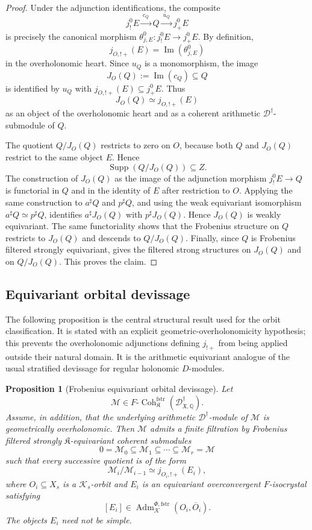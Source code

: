 \documentclass[11pt]{amsart}
\theoremstyle{plain}
\newtheorem{proposition}{Proposition}[section]
\theoremstyle{definition}
\theoremstyle{remark}
\newcommand{\Coh}{\operatorname{Coh}}
\newcommand{\Supp}{\operatorname{Supp}}
\newcommand{\fstr}{\mathrm{fstr}}
\newcommand{\Adm}{\operatorname{Adm}}
\begin{document}
\begin{proof}
Under the adjunction identifications, the composite
\[
  j^0_!E\xrightarrow{\ c_Q\ } Q
  \xrightarrow{\ u_Q\ } j^0_+E
\]
is precisely the canonical morphism
\(\theta^0_{j,E}:j^0_!E\to j^0_+E\).  By definition,
\[
  j_{O,!+}(E)=\operatorname{Im}(\theta^0_{j,E})
\]
in the overholonomic heart.  Since \(u_Q\) is a monomorphism, the image
\[
  J_O(Q):=\operatorname{Im}(c_Q)\subseteq Q
\]
is identified by \(u_Q\) with \(j_{O,!+}(E)\subseteq j^0_+E\).  Thus
\[
  J_O(Q)\simeq j_{O,!+}(E)
\]
as an object of the overholonomic heart and as a coherent arithmetic
\(\mathscr D^\dagger\)-submodule of \(Q\).

The quotient \(Q/J_O(Q)\) restricts to zero on \(O\), because both \(Q\) and
\(J_O(Q)\) restrict to the same object \(E\).  Hence
\[
  \Supp(Q/J_O(Q))\subseteq Z.
\]
The construction of \(J_O(Q)\) as the image of the adjunction morphism
\(j^0_!E\to Q\) is functorial in \(Q\) and in the identity of \(E\) after
restriction to \(O\).  Applying the same construction to \(a^\sharp Q\) and
\(p^\sharp Q\), and using the weak equivariant isomorphism
\(a^\sharp Q\simeq p^\sharp Q\), identifies \(a^\sharp J_O(Q)\) with
\(p^\sharp J_O(Q)\).  Hence \(J_O(Q)\) is weakly equivariant.  The same
functoriality shows that the Frobenius structure on \(Q\) restricts to
\(J_O(Q)\) and descends to \(Q/J_O(Q)\).  Finally, since \(Q\) is Frobenius
filtered strongly equivariant,  gives the
filtered strong structures on \(J_O(Q)\) and on \(Q/J_O(Q)\).  This proves the
claim.
\end{proof}

\subsection{Equivariant orbital devissage}

The following proposition is the central structural result used for the orbit
classification.  It is stated with an explicit geometric-overholonomicity
hypothesis; this prevents the overholonomic adjunctions defining \(j_{!+}\)
from being applied outside their natural domain.  It is the arithmetic
equivariant analogue of the usual stratified devissage for regular holonomic
\(D\)-modules.

\begin{proposition}[Frobenius equivariant orbital devissage]
\label{prop:equivariant-orbital-devissage}
Let
\[
  \mathcal M\in
  F\text{-}\Coh^{\fstr}_{\mathfrak K}
  (\mathscr D^\dagger_{\mathfrak X,\mathbb Q}).
\]
Assume, in addition, that the underlying arithmetic
\(\mathscr D^\dagger\)-module of \(\mathcal M\) is geometrically
overholonomic.  Then \(\mathcal M\) admits a finite filtration by Frobenius filtered strongly
\(\mathfrak K\)-equivariant coherent submodules
\[
  0=\mathcal M_0\subseteq \mathcal M_1\subseteq \cdots
  \subseteq \mathcal M_r=\mathcal M
\]
such that every successive quotient is of the form
\[
  \mathcal M_i/\mathcal M_{i-1}
  \simeq
  j_{O_i,!+}(E_i),
\]
where \(O_i\subseteq X_s\) is a \(\mathcal K_s\)-orbit and \(E_i\) is an
equivariant overconvergent \(F\)-isocrystal satisfying
\[
  [E_i]\in
  \Adm^{\Phi,\fstr}_{\mathcal K}(O_i,\overline O_i).
\]
The objects \(E_i\) need not be simple.
\end{proposition}
\end{document}
